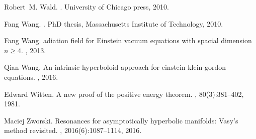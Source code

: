\documentclass[reqno,11pt,letterpaper]{amsart}
\numberwithin{equation}{section}
\numberwithin{figure}{section}
\theoremstyle{definition}
\theoremstyle{remark}
\begin{document}
\begin{thebibliography}{GCHMG05}
Robert~M. Wald.
.
\newblock University of Chicago press, 2010.

Fang Wang.
.
\newblock PhD thesis, Massachusetts Institute of Technology, 2010.

Fang Wang.
adiation field for {E}instein vacuum equations with spacial
  dimension $n\geq 4$.
, 2013.

Qian Wang.
\newblock An intrinsic hyperboloid approach for einstein klein-gordon
  equations.
, 2016.

Edward Witten.
\newblock A new proof of the positive energy theorem.
, 80(3):381--402, 1981.

Maciej Zworski.
\newblock Resonances for asymptotically hyperbolic manifolds: {V}asy's method
  revisited.
, 2016(6):1087--1114, 2016.

\end{thebibliography}
\end{document}
